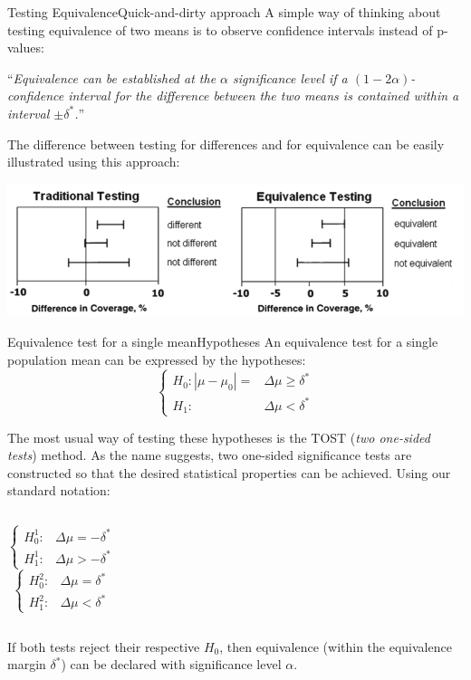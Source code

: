\begin{frame}{Testing Equivalence}{Quick-and-dirty approach}
A simple way of thinking about testing equivalence of two means is to observe confidence intervals instead of p-values:

\begin{exampleblock}{}
\centering ``\textit{Equivalence can be established at the $\alpha$ significance level if a $(1-2\alpha)$-confidence interval for the difference between the two means is contained within a interval $\pm\delta^*$.}''
\end{exampleblock}

The difference between testing for differences and for equivalence can be easily illustrated using this approach:

\centering\includegraphics[width=.8\textwidth]{../img/DiffVxEquiv.png}
\end{frame}

\begin{frame}{Equivalence test for a single mean}{Hypotheses}
An equivalence test for a single population mean can be expressed by the hypotheses:
\begin{equation*}
  \begin{cases}
  H_0: \left|\mu-\mu_0\right| = &\Delta\mu \geq\delta^*\\
  H_1: &\Delta\mu <\delta^*
  \end{cases}
\end{equation*}
\medskip

The most usual way of testing these hypotheses is the TOST (\textit{two one-sided tests}) method. As the name suggests, two one-sided significance tests are constructed so that the desired statistical properties can be achieved. Using our standard notation:
\begin{columns}[T]
\begin{equation*}
\begin{cases}
H_0^1: &\Delta\mu = -\delta^*\\
H_1^1: &\Delta\mu > -\delta^*
\end{cases}
\end{equation*}
\begin{equation*}
\begin{cases}
H_0^2: &\Delta\mu = \delta^*\\
H_1^2: &\Delta\mu < \delta^*
\end{cases}
\end{equation*}
\end{columns}
\bigskip
If both tests reject their respective $H_0$, then equivalence (within the equivalence margin $\delta^*$) can be declared with significance level $\alpha$.
\end{frame}

